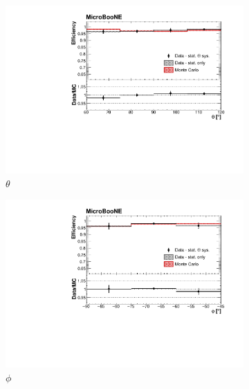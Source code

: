 \documentclass[a4paper,11pt]{article}
\begin{document}
\begin{figure}[htbp]
  \begin{center}
    \begin{subfigure}{0.5\textwidth}
      \includegraphics[width=\linewidth]{figures/theta2.pdf}
      \caption{$\theta$} \label{fig:theta}
    \end{subfigure}\begin{subfigure}{0.5\textwidth}
      \includegraphics[width=\linewidth]{figures/phi2.pdf}
      \caption{$\phi$} \label{fig:phi}
    \end{subfigure}
    \begin{subfigure}{0.5\textwidth}

\end{subfigure}
\end{center}
\end{figure}
\end{document}
